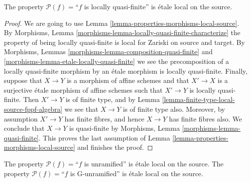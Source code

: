 \begin{lemma}
\label{lemma-locally-quasi-finite-etale-local-source}
The property $\mathcal{P}(f)=$``$f$ is locally quasi-finite''
is \'etale local on the source.
\end{lemma}

\begin{proof}
We are going to use
Lemma \ref{lemma-properties-morphisms-local-source}.
By
Morphisms, Lemma
\ref{morphisms-lemma-locally-quasi-finite-characterize}
the property of being locally quasi-finite is local for Zariski on source
and target. By
Morphisms, Lemmas
\ref{morphisms-lemma-composition-quasi-finite} and
\ref{morphisms-lemma-etale-locally-quasi-finite}
we see the precomposition
of a locally quasi-finite morphism by an \'etale morphism is locally
quasi-finite. Finally, suppose that $X \to Y$ is a morphism of affine schemes
and that $X' \to X$ is a surjective \'etale morphism of affine schemes
such that $X' \to Y$ is locally quasi-finite. Then $X' \to Y$ is of finite
type, and by
Lemma \ref{lemma-finite-type-local-source-fppf-algebra}
we see that $X \to Y$ is of finite type also.
Moreover, by assumption $X' \to Y$ has finite fibres, and hence $X \to Y$
has finite fibres also. We conclude that $X \to Y$ is quasi-finite by
Morphisms, Lemma \ref{morphisms-lemma-quasi-finite}.
This proves the last assumption of
Lemma \ref{lemma-properties-morphisms-local-source}
and finishes the proof.
\end{proof}

\begin{lemma}
\label{lemma-unramified-etale-local-source}
The property $\mathcal{P}(f)=$``$f$ is unramified''
is \'etale local on the source.
The property $\mathcal{P}(f)=$``$f$ is G-unramified''
is \'etale local on the source.
\end{lemma}

